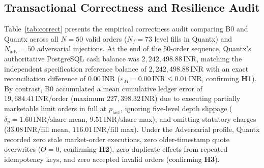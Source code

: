 \documentclass[journal,onecolumn,10pt]{IEEEtran}
\newcommand{\thinunit}[2]{#1\,\text{#2}}
\begin{document}
\subsection{Transactional Correctness and Resilience Audit}
Table~\ref{tab:correct} presents the empirical correctness audit comparing B0 and Quantx across all $N=50$ valid orders ($N_f=73$ level fills in Quantx) and $N_{\mathrm{adv}}=50$ adversarial injections. At the end of the 50-order sequence, Quantx's authoritative PostgreSQL cash balance was $\thinunit{2{,}242{,}498.88}{INR}$, matching the independent specification reference balance of $\thinunit{2{,}242{,}498.88}{INR}$ with an exact reconciliation difference of $\thinunit{0.00}{INR}$ ($\varepsilon_M = \thinunit{0.00}{INR} \le \thinunit{0.01}{INR}$, confirming \textbf{H1}). By contrast, B0 accumulated a mean cumulative ledger error of $\thinunit{19{,}684.41}{INR/order}$ (maximum $\thinunit{227{,}398.32}{INR}$) due to executing partially marketable limit orders in full at $p_{\mathrm{last}}$, ignoring five-level depth slippage ($\delta_p = \thinunit{1.60}{INR/share}$ mean, $\thinunit{9.51}{INR/share}$ max), and omitting statutory charges ($\thinunit{33.08}{INR/fill}$ mean, $\thinunit{116.01}{INR/fill}$ max). Under the Adversarial profile, Quantx recorded zero stale market-order executions, zero older-timestamp quote overwrites ($O=0$, confirming \textbf{H2}), zero duplicate effects from repeated idempotency keys, and zero accepted invalid orders (confirming \textbf{H3}).
\end{document}
